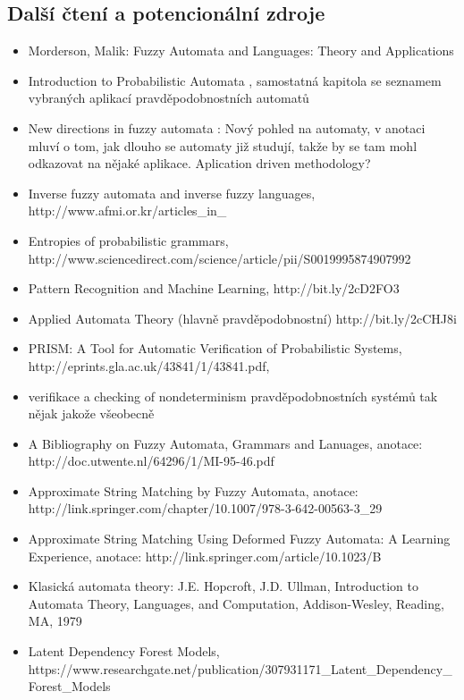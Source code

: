 \documentclass[a4paper,10pt]{article}
\begin{document}
\subsection{Další čtení a potencionální zdroje}
\begin{itemize}
 \item Morderson, Malik: Fuzzy Automata and Languages: Theory and Applications \cite{MorMal-FuzzAutAndLangs}
 \item Introduction to Probabilistic Automata \cite{Paz-IntroProbAut}, samostatná kapitola se seznamem vybraných aplikací pravděpodobnostních automatů
 \item New directions in fuzzy automata \cite{DooKre-NewDirFuzzAut}: Nový pohled na automaty, v anotaci mluví o tom, jak dlouho se automaty již studují, takže by se tam mohl odkazovat na nějaké aplikace. Aplication driven methodology?
 \item Inverse fuzzy automata and inverse fuzzy languages, http://www.afmi.or.kr/articles\_in\_%
 \item Entropies of probabilistic grammars, http://www.sciencedirect.com/science/article/pii/S0019995874907992
 \item Pattern Recognition and Machine Learning, http://bit.ly/2cD2FO3
 \item Applied Automata Theory (hlavně pravděpodobnostní) http://bit.ly/2cCHJ8i
 \item PRISM: A Tool for Automatic Verification of Probabilistic Systems, http://eprints.gla.ac.uk/43841/1/43841.pdf,
 \item verifikace a checking of nondeterminism pravděpodobnostních systémů tak nějak jakože všeobecně
 \item A Bibliography on Fuzzy Automata, Grammars and Lanuages, anotace: http://doc.utwente.nl/64296/1/MI-95-46.pdf
 \item Approximate String Matching by Fuzzy Automata, anotace: http://link.springer.com/chapter/10.1007/978-3-642-00563-3\_29
 \item Approximate String Matching Using Deformed Fuzzy Automata: A Learning Experience, anotace: http://link.springer.com/article/10.1023/B%
 \item Klasická automata theory: J.E. Hopcroft, J.D. Ullman, Introduction to Automata Theory, Languages, and Computation, Addison-Wesley, Reading,
MA, 1979
 \item Latent Dependency Forest Models, https://www.researchgate.net/publication/307931171\_Latent\_Dependency\_Forest\_Models

\end{itemize}
\end{document}
